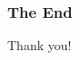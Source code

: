 \documentclass[unknownkeysallowed]{beamer}
\begin{document}
\begin{spacing}{1.2}
\begin{frame}
\begin{columns}[l]
\end{columns}
\end{frame}





\begin{frame}
\frametitle{The End}
\Huge{\centerline{Thank you!}}
\end{frame}
\end{spacing}
\end{document}
